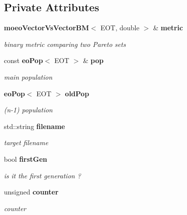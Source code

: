 \subsection*{Private Attributes}
\begin{CompactItemize}
\item 
{\bf moeo\-Vector\-Vs\-Vector\-BM}$<$ EOT, double $>$ \& {\bf metric}\label{classmoeoBinaryMetricSavingUpdater_52e12414a266bce1dbce0b913025fd37}

\begin{CompactList}\small\item\em binary metric comparing two Pareto sets \item\end{CompactList}\item 
const {\bf eo\-Pop}$<$ EOT $>$ \& {\bf pop}\label{classmoeoBinaryMetricSavingUpdater_9c30673aca66a1531856cb92068edaf7}

\begin{CompactList}\small\item\em main population \item\end{CompactList}\item 
{\bf eo\-Pop}$<$ EOT $>$ {\bf old\-Pop}\label{classmoeoBinaryMetricSavingUpdater_c1751bf23ef440d895a39cdff25c384c}

\begin{CompactList}\small\item\em (n-1) population \item\end{CompactList}\item 
std::string {\bf filename}\label{classmoeoBinaryMetricSavingUpdater_32c78860e3aee52346df3aa30c5ac42f}

\begin{CompactList}\small\item\em target filename \item\end{CompactList}\item 
bool {\bf first\-Gen}\label{classmoeoBinaryMetricSavingUpdater_1e40103a5cfa592a9d2408102e507a19}

\begin{CompactList}\small\item\em is it the first generation ? \item\end{CompactList}\item 
unsigned {\bf counter}\label{classmoeoBinaryMetricSavingUpdater_280b52506c280b07356726ad5d497ef8}

\begin{CompactList}\small\item\em counter \item\end{CompactList}\end{CompactItemize}


